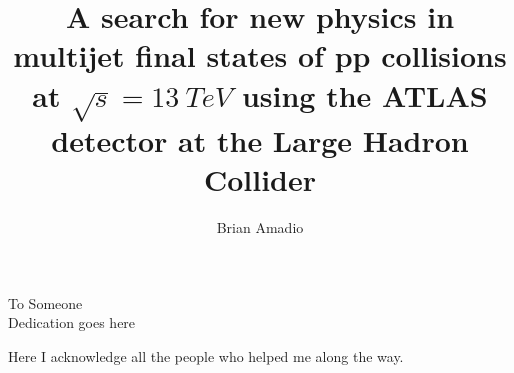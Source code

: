 \documentclass{ucbthesis}
\begin{document}

\title{A search for new physics in multijet
  final states of pp collisions at $\sqrt{s} = 13~TeV$ using the ATLAS
  detector at the Large Hadron Collider}

\author{Brian Amadio}




\maketitle
\copyrightpage



\begin{frontmatter}

\begin{dedication}
\null\vfil
\begin{center}

To Someone\\\vspace{12pt}
Dedication goes here
\end{center}
\vfil\null
\end{dedication}


\tableofcontents
\clearpage
\listoffigures
\clearpage
\listoftables

\begin{acknowledgements}

Here I acknowledge all the people who helped me along the way.

\end{acknowledgements}

\end{frontmatter}

\pagestyle{headings}













\printbibliography
\end{document}
